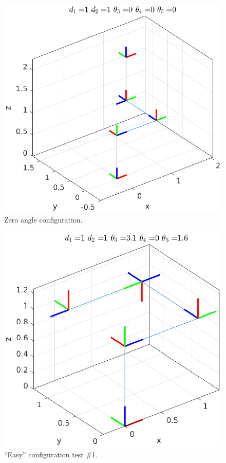 \documentclass[a4paper,10pt]{article}
\begin{document}
\begin{figure}[H] 
 \centering
 \includegraphics[width=1\linewidth]{configuration0.eps}
 \caption{Zero angle configuration.}\label{fig:conf0}
\end{figure}

\begin{figure}[H] 
 \centering
 \includegraphics[width=1\linewidth]{configuration1.eps}
 \caption{``Easy'' configuration test \#1.}\label{fig:conf1}
\end{figure}
\end{document}
